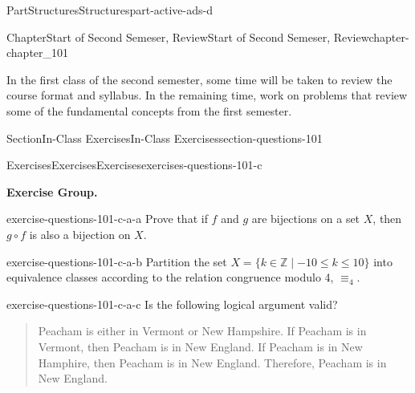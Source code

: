 \documentclass[oneside,10pt,]{book}
\numberwithin{equation}{section}
\begin{document}
\begin{partptx}{Part}{Structures}{}{Structures}{}{}{part-active-ads-d}
\renewcommand*{\partname}{Part}
%
\typeout{************************************************}
\typeout{************************************************}
%
\begin{chapterptx}{Chapter}{Start of Second Semeser, Review}{}{Start of Second Semeser, Review}{}{}{chapter-chapter_101}
\renewcommand*{\chaptername}{Chapter}
\begin{introduction}{}%
In the first class of the second semester, some time will be taken to review the course format and syllabus.  In the remaining time, work on problems that review some of the fundamental concepts from the first semester.%
\end{introduction}%
%
%
\typeout{************************************************}
\typeout{************************************************}
%
\begin{sectionptx}{Section}{In-Class Exercises}{}{In-Class Exercises}{}{}{section-questions-101}
%
%
%
\typeout{************************************************}
\typeout{************************************************}
%
\begin{exercises-subsection-numberless}{Exercises}{Exercises}{}{Exercises}{}{}{exercises-questions-101-c}
\par\medskip\noindent%
\textbf{Exercise Group.}\space\space%
\begin{exercisegroup}
\begin{divisionexerciseeg}{1}{}{}{exercise-questions-101-c-a-a}%
Prove that if \(f\) and \(g\) are bijections on a set \(X\), then \(g \circ f\) is also a bijection on \(X\).%
\end{divisionexerciseeg}%
\begin{divisionexerciseeg}{2}{}{}{exercise-questions-101-c-a-b}%
Partition the set \(X=\{k \in \mathbb{Z} \mid  -10 \leq k \leq 10\}\) into equivalence classes according to the relation congruence modulo 4, \(\equiv_4\).%
\end{divisionexerciseeg}%
\begin{divisionexerciseeg}{3}{}{}{exercise-questions-101-c-a-c}%
Is the following logical argument valid?%
\begin{quote}%
Peacham is either in Vermont or New Hampshire. If Peacham is in Vermont, then Peacham is in New England. If Peacham is in New Hamphire, then Peacham is in New England. Therefore, Peacham is in New England.%

\end{quote}
\end{divisionexerciseeg}
\end{exercisegroup}
\end{exercises-subsection-numberless}
\end{sectionptx}
\end{chapterptx}
\end{partptx}
\end{document}
